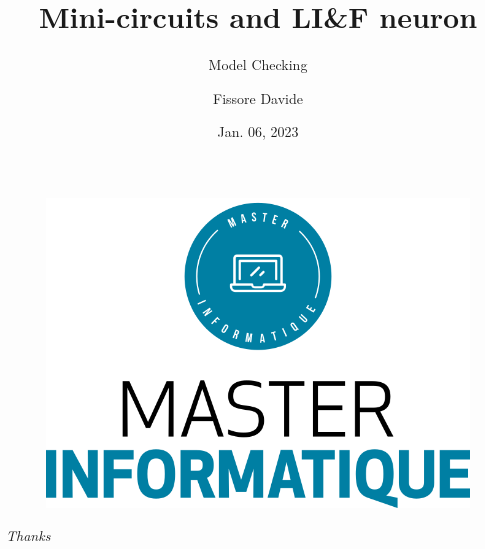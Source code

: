 \documentclass[usenames,dvipsnames]{beamer}
\author{Fissore Davide}
\title{Mini-circuits and LI\&F neuron}
\subtitle{Model Checking}
\institute{Université Côte d'Azur}
\date{Jan. 06, 2023}
\begin{document}
\begin{frame}
    \titlepage
    \begin{figure}[htpb]
        \begin{center}
            \includegraphics[width=0.2\linewidth]{pic/logo_master.png}
        \end{center}
    \end{figure}
\end{frame}


\begingroup
\AtBeginSection[] {}





\endgroup

\begin{frame}{}
    \centering \Large
    \emph{Thanks}
\end{frame}
\end{document}
